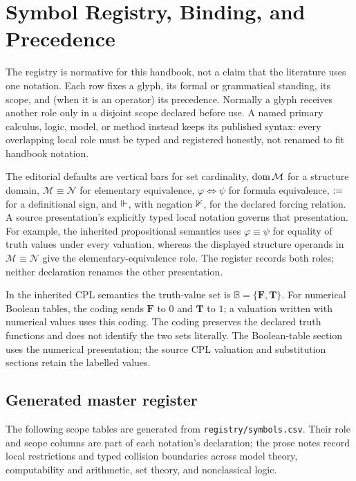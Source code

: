 \chapter{Symbol Registry, Binding, and Precedence}
\label{sec:p01-symbol-registry}

The registry is normative for this handbook, not a claim that the literature
uses one notation.  Each row fixes a glyph, its formal or grammatical
standing, its scope, and (when it is an operator) its precedence.  Normally a
glyph receives another role only in a disjoint scope declared before use.  A
named primary calculus, logic, model, or method instead keeps its published
syntax: every overlapping local role must be typed and registered honestly,
not renamed to fit handbook notation.

The editorial defaults are vertical bars for set cardinality,
\(\operatorname{dom}\mathcal M\) for a structure domain,
\(\mathcal M\equiv\mathcal N\) for elementary equivalence,
\(\varphi\Leftrightarrow\psi\) for formula equivalence,
\(\mathrel{:=}\) for a definitional sign, and \(\Vdash\), with negation
\(\nVdash\), for the declared forcing relation.  A source presentation's
explicitly typed local notation governs that presentation.  For example,
the inherited propositional semantics uses \(\varphi\equiv\psi\) for
equality of truth values under every valuation, whereas the displayed
structure operands in \(\mathcal M\equiv\mathcal N\) give the
elementary-equivalence role.  The register records both roles; neither
declaration renames the other presentation.

In the inherited CPL semantics the truth-value set is
\(\mathbb B=\{\mathbf F,\mathbf T\}\).
For numerical Boolean tables, the coding sends \(\mathbf F\) to \(0\)
and \(\mathbf T\) to \(1\); a valuation written with numerical values
uses this coding.  The coding preserves the declared truth functions and
does not identify the two sets literally.  The Boolean-table section uses
the numerical presentation; the source CPL valuation and substitution
sections retain the labelled values.

\section{Generated master register}
\label{sec:p01-generated-symbols}

The following scope tables are generated from
\texttt{registry/symbols.csv}.  Their role and scope columns are part of each
notation's declaration; the prose notes record local restrictions and
typed collision boundaries across model theory, computability and arithmetic,
set theory, and nonclassical logic.

